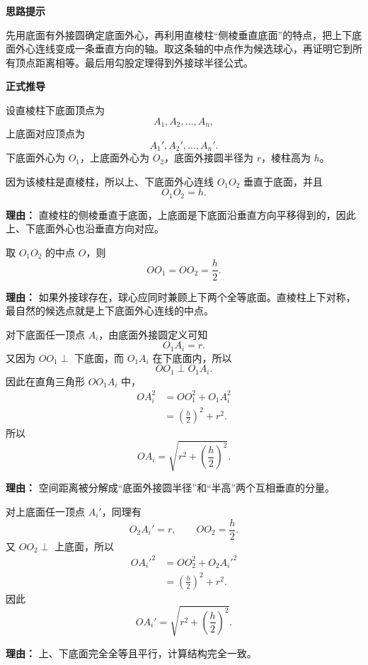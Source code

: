 \begin{proofbox}
	\textbf{\textcolor{CProof}{思路提示}}

	先用底面有外接圆确定底面外心，再利用直棱柱“侧棱垂直底面”的特点，把上下底面外心连线变成一条垂直方向的轴。取这条轴的中点作为候选球心，再证明它到所有顶点距离相等。最后用勾股定理得到外接球半径公式。

	\medskip
	\textbf{\textcolor{CProof}{正式推导}}
	\begin{description}[style=nextline, leftmargin=2.8em, labelsep=0.5em, itemsep=0.55em]
		\item[\textbf{步骤一（统一记号）：}]
		      设直棱柱下底面顶点为
		      \[
			      A_1,A_2,\ldots,A_n,
		      \]
		      上底面对应顶点为
		      \[
			      A_1',A_2',\ldots,A_n'.
		      \]
		      下底面外心为 $O_1$，上底面外心为 $O_2$，底面外接圆半径为 $r$，棱柱高为 $h$。

		      因为该棱柱是直棱柱，所以上、下底面外心连线 $O_1O_2$ 垂直于底面，并且
		      \[
			      O_1O_2=h.
		      \]
		      \par\textbf{理由：} 直棱柱的侧棱垂直于底面，上底面是下底面沿垂直方向平移得到的，因此上、下底面外心也沿垂直方向对应。

		\item[\textbf{步骤二（构造候选球心）：}]
		      取 $O_1O_2$ 的中点 $O$，则
		      \[
			      OO_1=OO_2=\frac{h}{2}.
		      \]
		      \par\textbf{理由：} 如果外接球存在，球心应同时兼顾上下两个全等底面。直棱柱上下对称，最自然的候选点就是上下底面外心连线的中点。

		\item[\textbf{步骤三（验证到底面顶点等距）：}]
		      对下底面任一顶点 $A_i$，由底面外接圆定义可知
		      \[
			      O_1A_i=r.
		      \]
		      又因为 $OO_1\perp$ 下底面，而 $O_1A_i$ 在下底面内，所以
		      \[
			      OO_1\perp O_1A_i.
		      \]
		      因此在直角三角形 $OO_1A_i$ 中，
		      \[
			      \begin{aligned}
				      OA_i^2
				       & =OO_1^2+O_1A_i^2                 \\
				       & =\left(\frac{h}{2}\right)^2+r^2.
			      \end{aligned}
		      \]
		      所以
		      \[
			      OA_i=\sqrt{r^2+\left(\frac{h}{2}\right)^2}.
		      \]
		      \par\textbf{理由：} 空间距离被分解成“底面外接圆半径”和“半高”两个互相垂直的分量。

		\item[\textbf{步骤四（验证到上底面顶点等距）：}]
		      对上底面任一顶点 $A_i'$，同理有
		      \[
			      O_2A_i'=r,\qquad OO_2=\frac{h}{2}.
		      \]
		      又 $OO_2\perp$ 上底面，所以
		      \[
			      \begin{aligned}
				      OA_i'^2
				       & =OO_2^2+O_2A_i'^2                \\
				       & =\left(\frac{h}{2}\right)^2+r^2.
			      \end{aligned}
		      \]
		      因此
		      \[
			      OA_i'=\sqrt{r^2+\left(\frac{h}{2}\right)^2}.
		      \]
		      \par\textbf{理由：} 上、下底面完全全等且平行，计算结构完全一致。


\end{description}
\end{proofbox}
